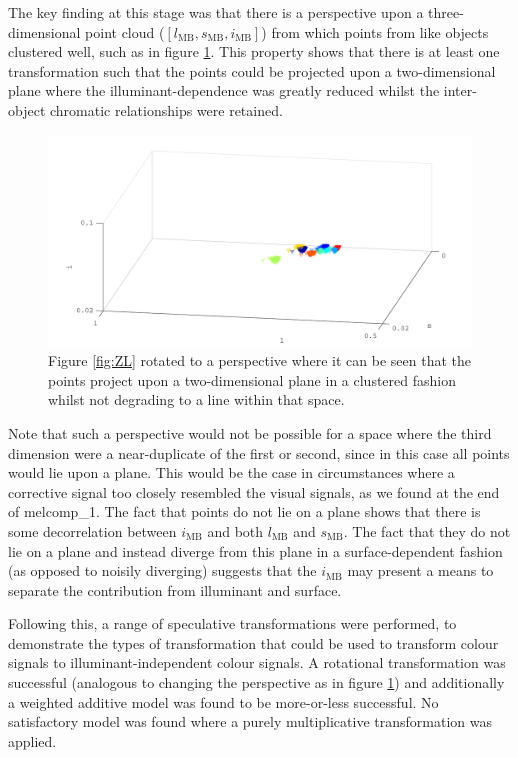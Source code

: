 The key finding at this stage was that there is a perspective upon a three-dimensional point cloud ($[l_{\text{MB}},s_{\text{MB}},i_{\text{MB}}]$) from which points from like objects clustered well, such as in figure \ref{fig:viewpoint}. This property shows that there is at least one transformation such that the points could be projected upon a two-dimensional plane where the illuminant-dependence was greatly reduced whilst the inter-object chromatic relationships were retained. 

\begin{figure}[htbp] %
 \includegraphics[max width=\textwidth]{figs/comp/melcomp_2_caller/viewpoint.pdf}
 \caption{Figure \ref{fig:ZL} rotated to a perspective where it can be seen that the points project upon a two-dimensional plane in a clustered fashion whilst not degrading to a line within that space.}
 \label{fig:viewpoint}
\end{figure} 

Note that such a perspective would not be possible for a space where the third dimension were a near-duplicate of the first or second, since in this case all points would lie upon a plane. This would be the case in circumstances where a corrective signal too closely resembled the visual signals, as we found at the end of melcomp\_1. The fact that points do not lie on a plane shows that there is some decorrelation between $i_{\text{MB}}$ and both $l_{\text{MB}}$ and $s_{\text{MB}}$. The fact that they do not lie on a plane and instead diverge from this plane in a surface-dependent fashion (as opposed to noisily diverging) suggests that the $i_{\text{MB}}$ may present a means to separate the contribution from illuminant and surface. 

Following this, a range of speculative transformations were performed, to demonstrate the types of transformation that could be used to transform colour signals to illuminant-independent colour signals. A rotational transformation was successful (analogous to changing the perspective as in figure \ref{fig:viewpoint}) and additionally a weighted additive model was found to be more-or-less successful. No satisfactory model was found where a purely multiplicative transformation was applied.


